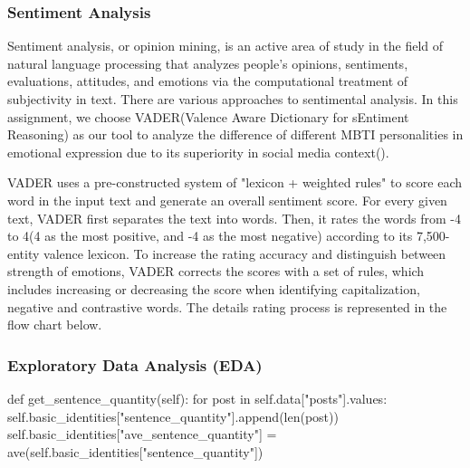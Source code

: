 \documentclass[12pt]{article}
\begin{document}
	 
	
	
	
	\subsubsection{Sentiment Analysis}
	Sentiment analysis, or opinion mining, is an active area of study in the field of natural language processing that analyzes people's opinions, sentiments, evaluations, attitudes, and emotions via the computational treatment of subjectivity in text. There are various approaches to sentimental analysis. In this assignment, we choose VADER(Valence Aware Dictionary for sEntiment Reasoning) as our tool to analyze the difference of different MBTI personalities in emotional expression due to its superiority in social media context(\cite{VADER}).
	
	VADER uses a pre-constructed system of "lexicon + weighted rules" to score each word in the input text and generate an overall sentiment score. For every given text, VADER first separates the text into words. Then, it rates the words from -4 to 4(4 as the most positive, and -4 as the most negative) according to its 7,500-entity valence lexicon. To increase the rating accuracy and distinguish between strength of emotions, VADER corrects the scores with a set of rules, which includes increasing or decreasing the score when identifying capitalization, negative and contrastive words. The details rating process is represented in the flow chart below.
	

	\subsubsection{Exploratory Data Analysis (EDA)}
	
	

	\begin{python}
def get_sentence_quantity(self):
    for post in self.data["posts"].values:
        self.basic_identities["sentence_quantity"].append(len(post))
    self.basic_identities["ave_sentence_quantity"] = ave(self.basic_identities["sentence_quantity"])
	\end{python}
	
	


	\printbibliography[title={References}]
\end{document}
